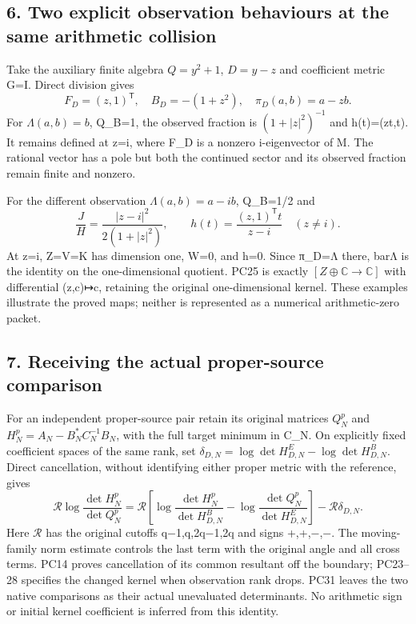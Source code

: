 \documentclass[11pt]{article}
\begin{document}
\subsection{6. Two explicit observation behaviours at the same arithmetic collision}\label{two-explicit-observation-behaviours-at-the-same-arithmetic-collision}

Take the auxiliary finite algebra \(Q=y^2+1\), \(D=y-z\) and coefficient metric G=I. Direct division gives \[
F_D=(z,1)^{\mathsf T},\quad B_D=-(1+z^2),\quad
\pi_D(a,b)=a-zb.
\tag{PC29}
\] For \(\Lambda(a,b)=b\), Q\_B=1, the observed fraction is \((1+|z|^2)^{-1}\) and h(t)=(zt,t). It remains defined at z=i, where F\_D is a nonzero i-eigenvector of M. The rational vector has a pole but both the continued sector and its observed fraction remain finite and nonzero.

For the different observation \(\Lambda(a,b)=a-ib\), Q\_B=1/2 and \[
\frac{J}{H}=\frac{|z-i|^2}{2(1+|z|^2)},\qquad
h(t)=\frac{(z,1)^{\mathsf T}t}{z-i}\quad(z\ne i).
\tag{PC30}
\] At z=i, Z=V=K has dimension one, W=0, and h=0. Since π\_D=Λ there, barΛ is the identity on the one-dimensional quotient. PC25 is exactly \([Z\oplus\mathbb C\to\mathbb C]\) with differential (z,c)↦c, retaining the original one-dimensional kernel. These examples illustrate the proved maps; neither is represented as a numerical arithmetic-zero packet.

\subsection{7. Receiving the actual proper-source comparison}\label{receiving-the-actual-proper-source-comparison}

For an independent proper-source pair retain its original matrices \(Q_N^p\) and \(H_N^p=A_N-B_N^*C_N^{-1}B_N\), with the full target minimum in C\_N. On explicitly fixed coefficient spaces of the same rank, set \(\delta_{D,N}=\log\det H_{D,N}^E-\log\det H_{D,N}^B\). Direct cancellation, without identifying either proper metric with the reference, gives \[
\mathcal R\log\frac{\det H_N^p}{\det Q_N^p}
=\mathcal R\left[\log\frac{\det H_N^p}{\det H_{D,N}^B}
-\log\frac{\det Q_N^p}{\det H_{D,N}^E}\right]
-\mathcal R\delta_{D,N}.
\tag{PC31}
\] Here \(\mathcal R\) has the original cutoffs q−1,q,2q−1,2q and signs +,+,−,−. The moving-family norm estimate controls the last term with the original angle and all cross terms. PC14 proves cancellation of its common resultant off the boundary; PC23--28 specifies the changed kernel when observation rank drops. PC31 leaves the two native comparisons as their actual unevaluated determinants. No arithmetic sign or initial kernel coefficient is inferred from this identity.
\end{document}
